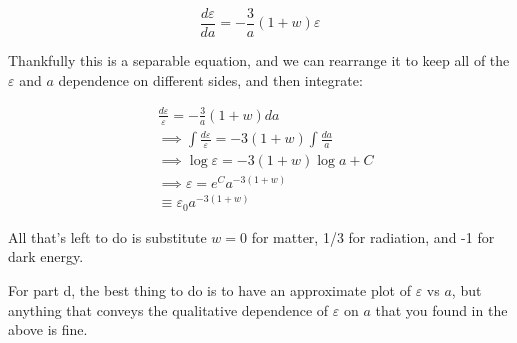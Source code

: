 \documentclass[12pt]{article}
\begin{document}
\[\frac{d\varepsilon}{da} = -\frac{3}{a}(1+w)\varepsilon
\]

Thankfully this is a separable equation, and we can rearrange it to keep all of the \(\varepsilon\) and \(a\) dependence on different sides, and then integrate:

\begin{align*}
&\frac{d\varepsilon}{\varepsilon} = -\frac{3}{a}(1+w)da \\
&\implies \int\frac{d\varepsilon}{\varepsilon} = -3(1+w)\int \frac{da}{a} \\
&\implies \log\varepsilon = -3(1+w)\log a + C \\
&\implies \varepsilon = e^Ca^{-3(1+w)} \\
&\equiv \boxed{\varepsilon_0a^{-3(1+w)}} 
\end{align*}

All that's left to do is substitute \(w = 0\) for matter, 1/3 for radiation, and -1 for dark energy.

For part d, the best thing to do is to have an approximate plot of \(\varepsilon\) vs \(a\), but anything that conveys the qualitative dependence of \(\varepsilon\) on \(a\) that you found in the above is fine.
\end{document}
